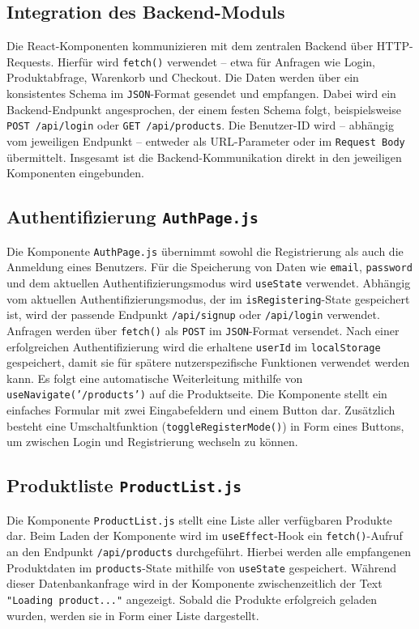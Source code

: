 \documentclass[oneside]{ausarbeitung}
\begin{document}
\subsection{Integration des Backend-Moduls}

Die React-Komponenten kommunizieren mit dem zentralen Backend über HTTP-Requests. Hierfür wird \texttt{fetch()} verwendet – etwa für Anfragen wie Login, Produktabfrage, Warenkorb und Checkout. Die Daten werden über ein konsistentes Schema im \texttt{JSON}-Format gesendet und empfangen.
Dabei wird ein Backend-Endpunkt angesprochen, der einem festen Schema folgt, beispielsweise \texttt{POST /api/login} oder \texttt{GET /api/products}. Die Benutzer-ID wird – abhängig vom jeweiligen Endpunkt – entweder als URL-Parameter oder im \texttt{Request Body} übermittelt.
Insgesamt ist die Backend-Kommunikation direkt in den jeweiligen Komponenten eingebunden.

\subsection{Authentifizierung \texttt{AuthPage.js}} 

Die Komponente \texttt{AuthPage.js} übernimmt sowohl die Registrierung als auch die Anmeldung eines Benutzers.
Für die Speicherung von Daten wie \texttt{email}, \texttt{password} und dem aktuellen Authentifizierungsmodus wird \texttt{useState} verwendet. Abhängig vom aktuellen Authentifizierungsmodus, der im \texttt{isRegistering}-State gespeichert ist, wird der passende Endpunkt \texttt{/api/signup} oder \texttt{/api/login} verwendet.
Anfragen werden über \texttt{fetch()} als \texttt{POST} im \texttt{JSON}-Format versendet.
Nach einer erfolgreichen Authentifizierung wird die erhaltene \texttt{userId} im \texttt{localStorage} gespeichert, damit sie für spätere nutzerspezifische Funktionen verwendet werden kann. Es folgt eine automatische Weiterleitung mithilfe von \texttt{useNavigate('/products')} auf die Produktseite.
Die Komponente stellt ein einfaches Formular mit zwei Eingabefeldern und einem Button dar. Zusätzlich besteht eine Umschaltfunktion (\texttt{toggleRegisterMode()}) in Form eines Buttons, um zwischen Login und Registrierung wechseln zu können.

\subsection{Produktliste \texttt{ProductList.js}} 

Die Komponente \texttt{ProductList.js} stellt eine Liste aller verfügbaren Produkte dar. Beim Laden der Komponente wird im \texttt{useEffect}-Hook ein \texttt{fetch()}-Aufruf an den Endpunkt \texttt{/api/products} durchgeführt. Hierbei werden alle empfangenen Produktdaten im \texttt{products}-State mithilfe von \texttt{useState} gespeichert. Während dieser Datenbankanfrage wird in der Komponente zwischenzeitlich der Text \texttt{"Loading product..."} angezeigt. Sobald die Produkte erfolgreich geladen wurden, werden sie in Form einer Liste dargestellt.
\end{document}
